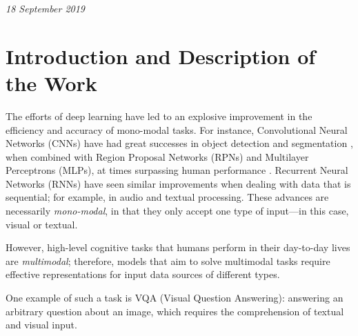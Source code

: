 \documentclass[12pt]{article}
\begin{document}
\thispagestyle{empty}


\vspace{0.3in}
\centerline{\large \emph{18 September 2019}}

\vspace{0.3in}


\vspace{0.2in}



\vspace{0.2in}



\vspace{0.2in}




\section*{Introduction and Description of the Work}

The efforts of deep learning have led to an explosive improvement in the efficiency and accuracy of mono-modal tasks. For instance, Convolutional Neural Networks (CNNs) have had great successes in object detection and segmentation \cite{fasterrcnn}, when combined with Region Proposal Networks (RPNs) and Multilayer Perceptrons (MLPs), at times surpassing human performance \cite{performance}. Recurrent Neural Networks (RNNs) have seen similar improvements when dealing with data that is sequential; for example, in audio and textual processing. These advances are necessarily \emph{mono-modal}, in that they only accept one type of input---in this case, visual or textual.

However, high-level cognitive tasks that humans perform in their day-to-day lives are \emph{multimodal}; therefore, models that aim to solve multimodal tasks require effective representations for input data sources of different types.

One example of such a task is VQA (Visual Question Answering): answering an arbitrary question about an image, which requires the comprehension of textual and visual input. 
\end{document}
